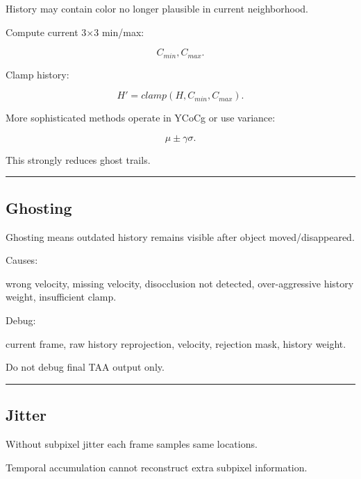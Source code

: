 \hypertarget{04-visual-computing-ii-ch040-neighborhood-clamping}{}

History may contain color no longer plausible in current neighborhood.

Compute current 3×3 min/max:

\[
C_{min},C_{max}.
\]

Clamp history:

\[
\boxed{
H'
=
clamp(
H,
C_{min},
C_{max}
).
}
\]

More sophisticated methods operate in YCoCg or use variance:

\[
\mu\pm\gamma\sigma.
\]

This strongly reduces ghost trails.

\begin{center}\rule{0.5\linewidth}{0.5pt}\end{center}

\subsection{Ghosting}\label{04-visual-computing-ii-ch040-ghosting}

\hypertarget{04-visual-computing-ii-ch040-ghosting}{}

Ghosting means outdated history remains visible after object moved/disappeared.

Causes:

wrong velocity, missing velocity, disocclusion not detected, over-aggressive history weight, insufficient clamp.

Debug:

current frame, raw history reprojection, velocity, rejection mask, history weight.

Do not debug final TAA output only.

\begin{center}\rule{0.5\linewidth}{0.5pt}\end{center}

\subsection{Jitter}\label{04-visual-computing-ii-ch040-jitter}

\hypertarget{04-visual-computing-ii-ch040-jitter}{}

Without subpixel jitter each frame samples same locations.

Temporal accumulation cannot reconstruct extra subpixel information.

